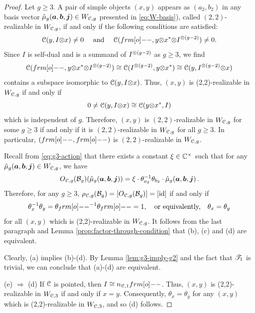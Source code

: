\documentclass[11pt]{article}
\begin{document}
\begin{proof}
Let $g \ge 3$. A pair of simple objects $(x, y)$ appears as $(a_2,b_2)$ in any basis vector ${\hat{\mu}_{g}(\bm{a}, \bm{b}, \bm{j})} \in W_{\mathcal{C},g}$ presented in \eqref{eq:W-basis}), called $(2,2)$-realizable in $W_{\mathcal{C},g}$,  if and only if the following conditions are satisfied:
$$
\cC(y, I \ot x) \ne 0 \quad \text{ and } \quad \cC(\1, y\ot x^* \ot I^{\ot (g-2)}) \ne 0.
$$
Since $I$ is self-dual and is a summand of $I^{\otimes (g-2)}$ as $g \ge 3$, we find 
\[\cC(\1, y\ot x^* \ot I^{\ot (g-2)}) \cong  \cC(I^{\ot (g-2)}, y\ot x^*) \cong \cC(y, I^{\ot (g-2)} \ot x)\]
contains a subspace isomorphic to $\mathcal{C}(y, I {\otimes} x)$. Thus, $(x,y)$ is (2,2)-realizable in $W_{\mathcal{C},g}$ if and only if
$$
0 \ne \mathcal{C}(y, I{\otimes} x) \cong \mathcal{C}(y{\otimes} x^*, I)
$$
which is independent of $g$. Therefore, $(x,y)$ is $(2,2)$-realizable in $W_{\mathcal{C},g}$ for some $g \ge 3$ if and only if it is $(2,2)$-realizable in $W_{\mathcal{C},g}$ for all $g \ge 3$.  In particular, $(\1,\1)$ is $(2,2)$-realizable in $W_{\mathcal{C},g}$. 


Recall from \eqref{eq:g3-action} that there exists a constant $\xi \in {\mathbb{C}}^\times$ such that for any ${\hat{\mu}_{g}(\bm{a}, \bm{b}, \bm{j})} \in W_{\mathcal{C},g}$, we have 
\[\RTmat{\cC}{g}(\db_g)(\Wbase{g}{a}{b}{j}) = \xi \cdot \theta_{a_{2}}^{-1}\theta_{b_{2}} \cdot \Wbase{g}{a}{b}{j}\,.\]
Therefore, for any $g \ge 3$, $\RTrep{\cC}{g}(\db_g) = [\RTmat{\cC}{g}(\db_g)] = [\id]$  if and only if 
\begin{equation} \label{eq:trivial_condition}
\theta_x^{-1} \theta_y = \theta_\1^{-1} \theta_\1 = 1, \quad \text{or equivalently,} \quad \theta_x = \theta_y
\end{equation}
for all $(x,y)$ which is (2,2)-realizable in $W_{\mathcal{C},g}$. It follows from the last paragraph and Lemma \ref{prop:factor-through-condition} that (b), (c) and (d) are equivalent.

 Clearly, (a) implies (b)-(d). By Lemma \ref{lem:g3-imply-g2} and the fact that $\mathscr{T}_{1}$ is trivial, we can conclude that (a)-(d) are equivalent.

(e) $\Rightarrow$ (d) If $\mathcal{C}$ is pointed, then $I \cong \ncg{\CC}{1} \1$. Thus, $(x,y)$ is (2,2)-realizable in $W_{\mathcal{C},3}$ if and only if $x=y$. Consequently, $\theta_x = \theta_y$ for any $(x,y)$ which is (2,2)-realizable in $W_{\mathcal{C},3}$, and so (d) follows.


\end{proof}
\end{document}
